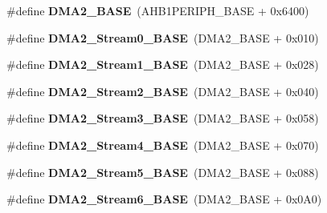 \begin{DoxyCompactItemize}
\item 
\hypertarget{group___peripheral__memory__map_gab72a9ae145053ee13d1d491fb5c1df64}{\#define {\bfseries D\-M\-A2\-\_\-\-B\-A\-S\-E}~(A\-H\-B1\-P\-E\-R\-I\-P\-H\-\_\-\-B\-A\-S\-E + 0x6400)}\label{group___peripheral__memory__map_gab72a9ae145053ee13d1d491fb5c1df64}

\item 
\hypertarget{group___peripheral__memory__map_gac4c67b24726ba6b94d03adb351bcec4d}{\#define {\bfseries D\-M\-A2\-\_\-\-Stream0\-\_\-\-B\-A\-S\-E}~(D\-M\-A2\-\_\-\-B\-A\-S\-E + 0x010)}\label{group___peripheral__memory__map_gac4c67b24726ba6b94d03adb351bcec4d}

\item 
\hypertarget{group___peripheral__memory__map_ga35512bdc3f5e9df4557c2fbe7935d0b1}{\#define {\bfseries D\-M\-A2\-\_\-\-Stream1\-\_\-\-B\-A\-S\-E}~(D\-M\-A2\-\_\-\-B\-A\-S\-E + 0x028)}\label{group___peripheral__memory__map_ga35512bdc3f5e9df4557c2fbe7935d0b1}

\item 
\hypertarget{group___peripheral__memory__map_gaed33a06f08188466f2ede06160984e9a}{\#define {\bfseries D\-M\-A2\-\_\-\-Stream2\-\_\-\-B\-A\-S\-E}~(D\-M\-A2\-\_\-\-B\-A\-S\-E + 0x040)}\label{group___peripheral__memory__map_gaed33a06f08188466f2ede06160984e9a}

\item 
\hypertarget{group___peripheral__memory__map_gaf3a9480e08c6ae94f4482e0cdaebdd17}{\#define {\bfseries D\-M\-A2\-\_\-\-Stream3\-\_\-\-B\-A\-S\-E}~(D\-M\-A2\-\_\-\-B\-A\-S\-E + 0x058)}\label{group___peripheral__memory__map_gaf3a9480e08c6ae94f4482e0cdaebdd17}

\item 
\hypertarget{group___peripheral__memory__map_gad1e67740e6301233473f64638145dd1f}{\#define {\bfseries D\-M\-A2\-\_\-\-Stream4\-\_\-\-B\-A\-S\-E}~(D\-M\-A2\-\_\-\-B\-A\-S\-E + 0x070)}\label{group___peripheral__memory__map_gad1e67740e6301233473f64638145dd1f}

\item 
\hypertarget{group___peripheral__memory__map_gaed1460fdc407b6decfbffccb0260d0af}{\#define {\bfseries D\-M\-A2\-\_\-\-Stream5\-\_\-\-B\-A\-S\-E}~(D\-M\-A2\-\_\-\-B\-A\-S\-E + 0x088)}\label{group___peripheral__memory__map_gaed1460fdc407b6decfbffccb0260d0af}

\item 
\hypertarget{group___peripheral__memory__map_ga5e81174c96fd204fa7c82c815e85c8e6}{\#define {\bfseries D\-M\-A2\-\_\-\-Stream6\-\_\-\-B\-A\-S\-E}~(D\-M\-A2\-\_\-\-B\-A\-S\-E + 0x0\-A0)}\label{group___peripheral__memory__map_ga5e81174c96fd204fa7c82c815e85c8e6}


\end{DoxyCompactItemize}
